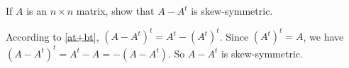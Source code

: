 \documentclass{ximera}
\begin{document}
\begin{exercise} \label{YZ_1.3_skewsym2}
If $A$ is an $n\times n$ matrix, show that $A-A^t$ is skew-symmetric.

\begin{solution}
\soln According to \eqref{at+bt}, $(A-A^t)^t=A^t-(A^t)^t$. Since $(A^t)^t=A$, we have 
$(A-A^t)^t=A^t-A=-(A-A^t)$.
So $A-A^t$ is skew-symmetric.
\end{solution}
\end{exercise}
\end{document}
